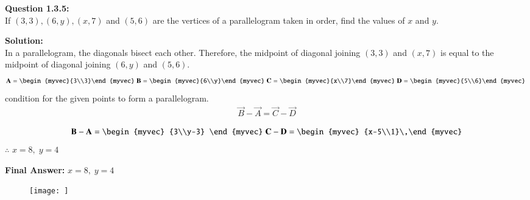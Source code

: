 \documentclass[journal]{IEEEtran}
\begin{document}

\textbf{Question 1.3.5:} \\
If $(3,3), (6,y), (x,7)$ and $(5,6)$ are the vertices of a parallelogram taken in order, 
find the values of $x$ and $y$.

\bigskip
\textbf{Solution:} \\
In a parallelogram, the diagonals bisect each other. Therefore, the midpoint of diagonal 
joining $(3,3)$ and $(x,7)$ is equal to the midpoint of diagonal joining $(6,y)$ and $(5,6)$.
\begin{align}
    \vec{A}=\begin{myvec}{3\\3}\end{myvec}\;
    \vec{B}=\begin{myvec}{6\\y}\end{myvec}\;
    \vec{C}=\begin{myvec}{x\\7}\end{myvec}\;         \vec{D}=\begin{myvec}{5\\6}\end{myvec}\
\end{align}
condition for the given points to form a parallelogram.\\
\begin{align}
    \vec{B}-\vec{A}=\vec{C}-\vec{D}
\end{align}


\begin{align}
    \vec{B}-\vec{A}=\begin{myvec}
        {3\\y-3}
    \end{myvec} \;
    \vec{C}-\vec{D}=\begin{myvec}
        {x-5\\1}\
    \end{myvec}
\end{align}
$\therefore$ $x=8, \; y=4$  


\bigskip
\textbf{Final Answer:} \quad $x=8, \; y=4$

\begin{figure}
    \centering
    \texttt{[image: ]}
    \caption{}
    \label{fig:placeholder}
\end{figure}
\end{document}
